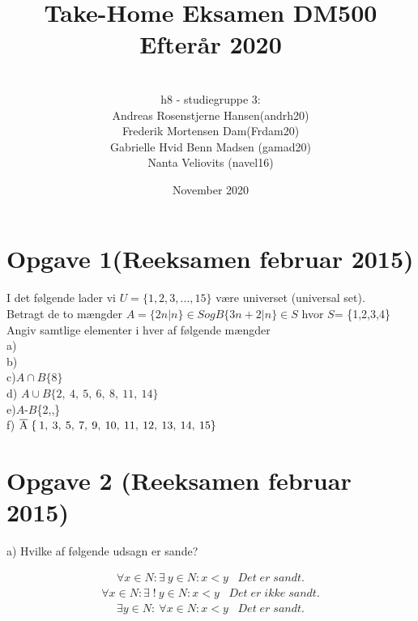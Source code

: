 \documentclass{article}
\title{Take-Home Eksamen DM500 Efterår 2020}
\author{
\\
h8 - studiegruppe 3:
\\
Andreas Rosenstjerne Hansen(andrh20)
\\
Frederik Mortensen Dam(Frdam20)
\\
Gabrielle Hvid Benn Madsen (gamad20)
\\
Nanta Veliovits (navel16)
\\
}
\date{November 2020}
\begin{document}
\maketitle
\pagebreak

\section{Opgave 1(Reeksamen februar 2015)}
I det følgende lader vi $U = \{ 1,2,3,...,15 \} $ være universet (universal set).
\\
\newline Betragt de to mængder
\newline
\begin{math}
A = \{ 2n|n \} \in S og B \{ 3n + 2|n \} \in S
\end{math}
\newline hvor $S$= \{1,2,3,4\}
\\
\newline Angiv samtlige elementer i hver af følgende mængder
\\
\newline
a)
\\
\newline
b)
\\
\newline
c)\;$A \cap B \{ 8 \} $
\\
\newline
d)\; $A \cup B \{2,\:4,\:5,\:6,\:8,\:11,\:14\} $
\\
\newline
e)\;$A$\:-\:$B$\:\{2,,\}
\\
\newline
f)\; $\overline{\rm A}\;\{\:1,\:3,\:5,\:7,\:9,\:10,\:11,\:12,\:13,\:14,\:15\} $

\section{Opgave 2 (Reeksamen februar 2015)}
a)\; Hvilke af følgende udsagn er sande?

\begin{align*}
\forall x \in N:\exists\:y \in N: x< y \;\;\;Det\;er\;sandt.
\end{align*}
\begin{align*}
\forall x \in N:\exists\;!\:y \in N: x< y \;\;\;Det\;er\;ikke\;sandt.
\end{align*}
\begin{align*}
\exists y \in N:\:\forall x \in N: x< y \;\;\;Det\;er\;sandt.
\end{align*}
\end{document}
